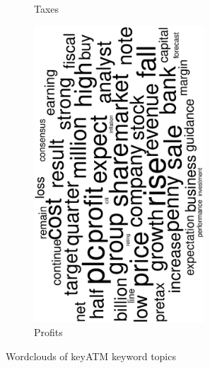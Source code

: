 \begin{figure}
\begin{subfigure}{0.32\textwidth}
		\caption{Taxes}
	\end{subfigure}
	\begin{subfigure}{0.32\textwidth}
		\includegraphics[width=0.7\textwidth,angle=270]{figures/wordcloud10.eps}
		\caption{Profits}
	\end{subfigure}

	\caption{Wordclouds of \textsf{keyATM} keyword topics}
	\label{fig:wordclouds}
\end{figure}
\newpage

  
  
 
